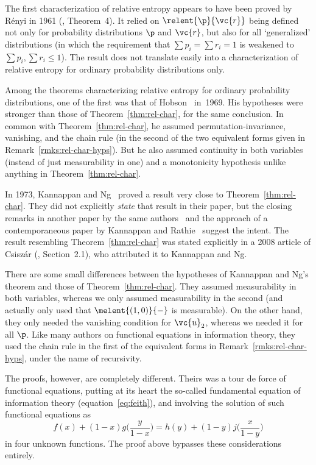 \begin{remark}
% 
The first characterization of relative entropy appears to have
been proved by R\'enyi%
%
%
in 1961 (\cite{Reny}, Theorem~4).  It relied on $\relent{\p}{\vc{r}}$
being defined not only for probability distributions $\p$ and $\vc{r}$, but
also for all `generalized'%
%
%
%
distributions (in which
the requirement that $\sum p_i = \sum r_i = 1$ is weakened to $\sum p_i,
\sum r_i \leq 1$).  The result does not translate easily into a
characterization of relative entropy for ordinary probability distributions
only.

Among the theorems characterizing relative entropy for ordinary probability
distributions, one of the first was that of Hobson~\cite{Hobs}%
%
%
in~1969.  His hypotheses were stronger than those of
Theorem~\ref{thm:rel-char}, for the same conclusion.  In common with
Theorem~\ref{thm:rel-char}, he assumed permutation-invariance, vanishing,
and the chain rule (in the second of the two equivalent forms given in
Remark~\ref{rmks:rel-char-hyps}).  But he also
assumed continuity in both variables (instead of just measurability in one)
and a monotonicity hypothesis unlike anything in
Theorem~\ref{thm:rel-char}.

In 1973, Kannappan%
%
%  
and Ng~\cite{KaNgMSF}%
%
%
proved a result very close to Theorem~\ref{thm:rel-char}.  They did not
explicitly \emph{state} that result in their paper, but the closing remarks
in another paper by the same authors~\cite{KaNgFEC} and the approach of a
contemporaneous paper by Kannappan and Rathie~\cite{KaRa} suggest
the intent.  The result resembling Theorem~\ref{thm:rel-char} was stated
explicitly in a 2008 article of Csisz\'ar (\cite{Csis}, Section~2.1), who
attributed it to Kannappan and Ng.

There are some small differences between the hypotheses of Kannappan and
Ng's theorem and those of Theorem~\ref{thm:rel-char}.  They assumed
measurability in both variables, whereas we only assumed measurability in
the second (and actually only used that $\melent{(1, 0)}{-}$ is
measurable).  On the other hand, they only needed the vanishing condition
for $\vc{u}_2$, whereas we needed it for all $\p$.  Like many authors on
functional equations in information theory, they used the chain rule in the
first of the equivalent forms in
Remark~\ref{rmks:rel-char-hyps}, under the name
of recursivity.

The proofs, however, are completely different.  Theirs was a tour de force
of functional equations, putting at its heart the so-called fundamental%
% 
% 
equation of information theory (equation~\eqref{eq:feith}), and involving
the solution of such functional equations as
\[
f(x) + (1 - x) g\biggl( \frac{y}{1 - x} \biggr)
=
h(y) + (1 - y) j\biggl( \frac{x}{1 - y} \biggr)
\]
in four unknown functions.  The proof above bypasses these considerations
entirely. 
\end{remark}

